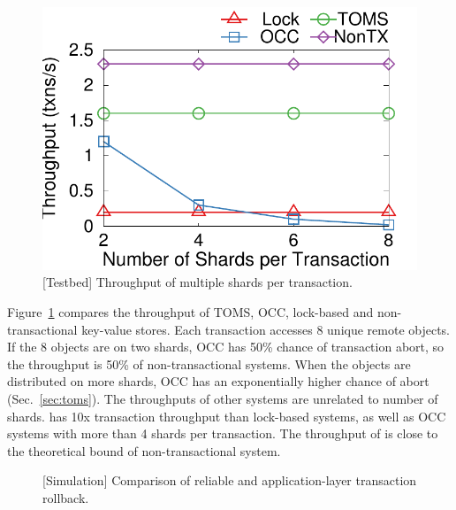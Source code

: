 \begin{figure}[t]
\centering
\includegraphics[width=.35\textwidth]{gnuplot/multishard.pdf}
\caption{[Testbed] Throughput of multiple shards per transaction.}
\label{fig:multishard}
\vspace{-10pt}
\end{figure}

Figure~\ref{fig:multishard} compares the throughput of TOMS, OCC, lock-based and non-transactional key-value stores.
Each transaction accesses 8 unique remote objects.
If the 8 objects are on two shards, OCC has 50\% chance of transaction abort, so the throughput is 50\% of non-transactional systems. When the objects are distributed on more shards, OCC has an exponentially higher chance of abort (Sec.~\ref{sec:toms}). The throughputs of other systems are unrelated to number of shards. \sys has 10x transaction throughput than lock-based systems, as well as OCC systems with more than 4 shards per transaction. The throughput of \sys is close to the theoretical bound of non-transactional system.



\begin{figure}[t]
\centering
	\hspace{0.01\textwidth}
\caption{[Simulation] Comparison of reliable \sys and application-layer transaction rollback.}
\label{fig:ycsb-loss}
\end{figure}

